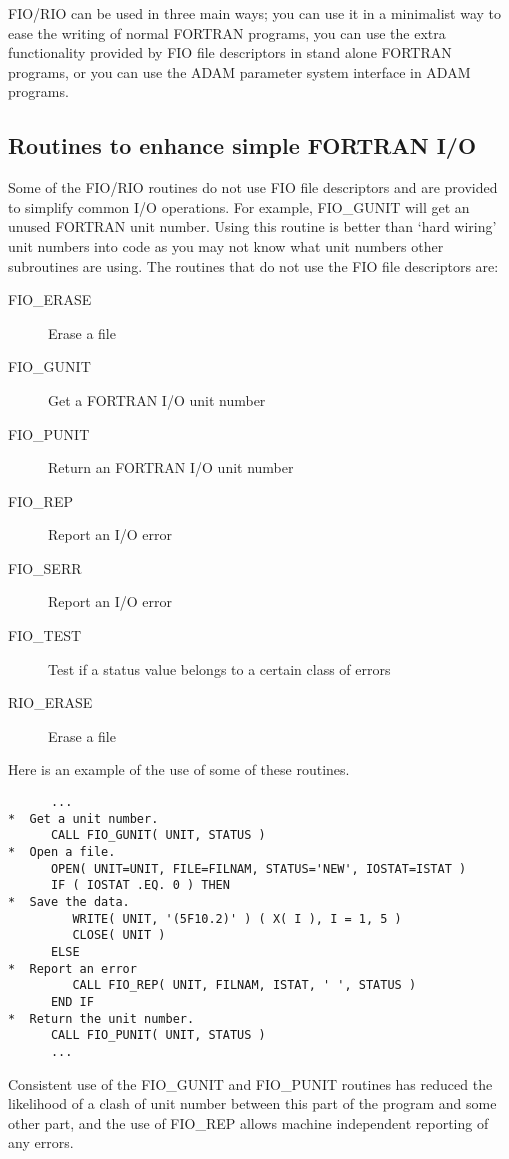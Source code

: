 FIO/RIO can be used in three main ways; you can use it in a minimalist way to
ease the writing of normal FORTRAN programs, you can use the extra
functionality provided by FIO file descriptors in stand alone FORTRAN programs,
or you can use the ADAM parameter system interface in ADAM programs.

\subsection{Routines to enhance simple FORTRAN I/O}

Some of the FIO/RIO routines do not use FIO file descriptors and are provided
to simplify common I/O operations. For example, FIO\_GUNIT will get an unused
FORTRAN unit number. Using this routine is better than `hard wiring' unit
numbers into code as you may not know what unit numbers other subroutines are
using. The routines that do not use the FIO file descriptors are:

\begin{description}
\item[FIO\_ERASE] Erase a file
\item[FIO\_GUNIT] Get a FORTRAN I/O unit number
\item[FIO\_PUNIT] Return an FORTRAN I/O unit number
\item[FIO\_REP]  Report an I/O error
\item[FIO\_SERR]  Report an I/O error
\item[FIO\_TEST]  Test if a status value belongs to a certain class of errors
\item[RIO\_ERASE] Erase a file
\end{description}

Here is an example of the use of some of these routines.

\begin{verbatim}
      ...
*  Get a unit number.
      CALL FIO_GUNIT( UNIT, STATUS )
*  Open a file.
      OPEN( UNIT=UNIT, FILE=FILNAM, STATUS='NEW', IOSTAT=ISTAT )
      IF ( IOSTAT .EQ. 0 ) THEN
*  Save the data.
         WRITE( UNIT, '(5F10.2)' ) ( X( I ), I = 1, 5 )
         CLOSE( UNIT )
      ELSE
*  Report an error
         CALL FIO_REP( UNIT, FILNAM, ISTAT, ' ', STATUS )
      END IF
*  Return the unit number.
      CALL FIO_PUNIT( UNIT, STATUS )
      ...
\end{verbatim}

Consistent use of the FIO\_GUNIT and FIO\_PUNIT routines has reduced the
likelihood of a clash of unit number between this part of the program and some
other part, and the use of FIO\_REP allows machine independent reporting of
any errors.

